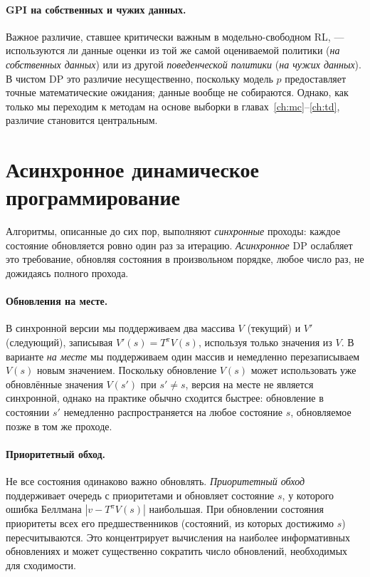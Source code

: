 \paragraph{GPI на собственных и чужих данных.}
Важное различие, ставшее критически важным в модельно-свободном RL, — используются ли данные оценки из той же самой оцениваемой политики (\emph{на собственных данных}) или из другой \emph{поведенческой политики} (\emph{на чужих данных}).  В чистом DP это различие несущественно, поскольку модель $p$ предоставляет точные математические ожидания; данные вообще не собираются.  Однако, как только мы переходим к методам на основе выборки в главах~\ref{ch:mc}--\ref{ch:td}, различие становится центральным.

\section{Асинхронное динамическое программирование}
\label{sec:async-dp}

Алгоритмы, описанные до сих пор, выполняют \emph{синхронные} проходы: каждое состояние обновляется ровно один раз за итерацию.  \emph{Асинхронное} DP ослабляет это требование, обновляя состояния в произвольном порядке, любое число раз, не дожидаясь полного прохода.

\paragraph{Обновления на месте.}
В синхронной версии мы поддерживаем два массива $V$ (текущий) и $V'$ (следующий), записывая $V'(s) = T^\pi V(s)$, используя только значения из $V$.  В варианте \emph{на месте} мы поддерживаем один массив и немедленно перезаписываем $V(s)$ новым значением.  Поскольку обновление $V(s)$ может использовать уже обновлённые значения $V(s')$ при $s' \ne s$, версия на месте не является синхронной, однако на практике обычно сходится быстрее: обновление в состоянии $s'$ немедленно распространяется на любое состояние $s$, обновляемое позже в том же проходе.

\paragraph{Приоритетный обход.}
Не все состояния одинаково важно обновлять.  \emph{Приоритетный обход} поддерживает очередь с приоритетами и обновляет состояние $s$, у которого ошибка Беллмана $|v - T^\pi V(s)|$ наибольшая.  При обновлении состояния приоритеты всех его предшественников (состояний, из которых достижимо $s$) пересчитываются.  Это концентрирует вычисления на наиболее информативных обновлениях и может существенно сократить число обновлений, необходимых для сходимости.

